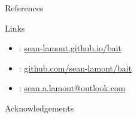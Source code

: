 \documentclass[final]{beamer}
\newlength{\onecolwid}
\begin{document}
\begin{frame}[t]
\begin{columns}[t]
\begin{column}{\onecolwid}
\begin{block}{References}
                    \begin{alertblock}{Links}

                        \begin{itemize}
                            \item \faLink : \href{https://sean-lamont.github.io/bait}{sean-lamont.github.io/bait}
                            \item \faGithub : \href{https://github.com/sean-lamont/bait}{github.com/sean-lamont/bait}
                            \item \faEnvelope : \href{mailto:sean.a.lamont@outlook.com}{sean.a.lamont@outlook.com}
                        \end{itemize}

                    \end{alertblock}


                \end{block}






                \begin{block}{Acknowledgements}

                    \small{} \\
                \end{block}



            \end{column} %

        \end{columns} %

    \end{frame} %
\end{document}
